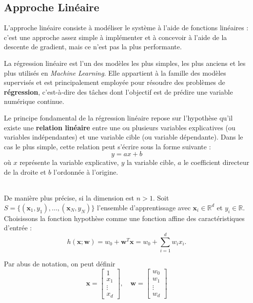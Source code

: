\documentclass{article}
\theoremstyle{nopointbreak}
\theoremstyle{nobrkbold}
\begin{document}
\subsection{Approche Linéaire }

L'approche linéaire consiste à modéliser le système à l'aide de fonctions linéaires : c'est une approche assez simple à implémenter et à concevoir à l'aide de la descente de gradient, mais ce n'est pas la plus performante.  

La régression linéaire est l’un des modèles les plus simples, les plus anciens et les plus utilisés en \textit{Machine Learning}. Elle appartient à la famille des modèles supervisés et est principalement employée pour résoudre des problèmes de \textbf{régression}, c’est-à-dire des tâches dont l’objectif est de prédire une variable numérique continue. 

Le principe fondamental de la régression linéaire repose sur l’hypothèse qu’il existe une \textbf{relation linéaire} entre une ou plusieurs variables explicatives (ou variables indépendantes) et une variable cible (ou variable dépendante). Dans le cas le plus simple, cette relation peut s’écrire sous la forme suivante :
\[
y = ax + b
\]
où $x$ représente la variable explicative, $y$ la variable cible, $a$ le coefficient directeur de la droite et $b$ l’ordonnée à l’origine.

\\
De manière plus précise, si la dimension est $n > 1$. Soit $S = \{(\mathbf{x}_1, y_1), \dots, (\mathbf{x}_N, y_N)\}$ l'ensemble d'apprentissage avec $\mathbf{x}_i \in \mathbb{R}^d$ et $y_i \in \mathbb{R}$.
\\

Choisissons la fonction hypothèse comme une fonction affine des caractéristiques d'entrée :
$$h(\mathbf{x}; \mathbf{w}) = w_0 + \mathbf{w}^T \mathbf{x} = w_0 + \sum_{i=1}^{d} w_i x_i.$$

Par abus de notation, on peut définir
$$\mathbf{x} = \begin{bmatrix}
1 \\
x_1 \\
\vdots \\
x_d
\end{bmatrix}, \quad \mathbf{w} = \begin{bmatrix}
w_0 \\
w_1 \\
\vdots \\
w_d
\end{bmatrix}$$
\end{document}
